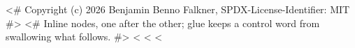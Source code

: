 <# Copyright (c) 2026 Benjamin Benno Falkner, SPDX-License-Identifier: MIT #>
<# Inline nodes, one after the other; glue keeps a control word from swallowing what follows. #>
<%
<%
<%
